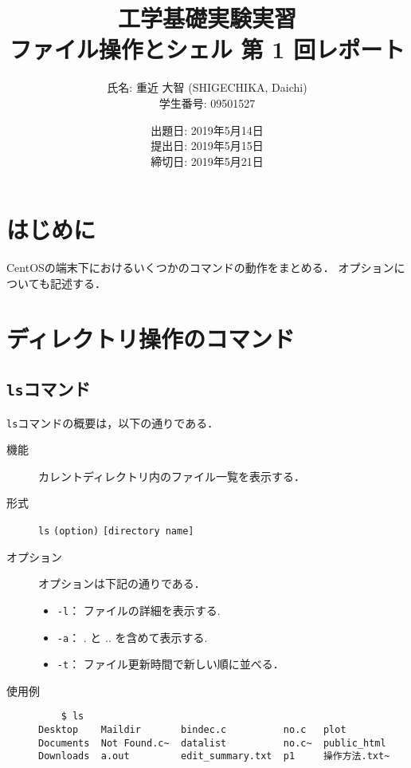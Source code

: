 \documentclass[a4j,11pt]{jarticle}
\title{工学基礎実験実習 \\
       ファイル操作とシェル 第 1 回レポート}
\author{氏名: 重近 大智 (SHIGECHIKA, Daichi) \\
        学生番号: 09501527}
\date{出題日: 2019年5月14日 \\
      提出日: 2019年5月15日 \\
      締切日: 2019年5月21日 \\}  %
\begin{document}
\maketitle

\section{はじめに}
CentOSの端末下におけるいくつかのコマンドの動作をまとめる．
オプションについても記述する．
\section{ディレクトリ操作のコマンド}

\subsection{\texttt{ls}コマンド}

\verb|ls|コマンドの概要は，以下の通りである．
\begin{description}
  \item[機能] %
    カレントディレクトリ内のファイル一覧を表示する．
  \item[形式] %
    \verb|ls| \verb|(option)| \verb|[directory name]|
  \item[オプション] %
    オプションは下記の通りである．
    \begin{itemize}
      \item \verb|-l|：  ファイルの詳細を表示する.
      \item \verb|-a|：  . と .. を含めて表示する.
      \item \verb|-t|：  ファイル更新時間で新しい順に並べる．
    \end{itemize}
  \item[使用例] %
    \begin{verbatim}
    $ ls
Desktop    Maildir       bindec.c          no.c   plot
Documents  Not Found.c~  datalist          no.c~  public_html
Downloads  a.out         edit_summary.txt  p1     操作方法.txt~

    \end{verbatim}
\end{description}
\end{document}

